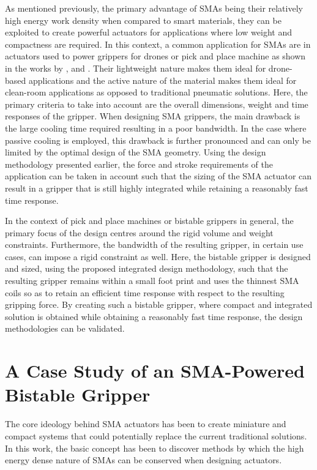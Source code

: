 As mentioned previously, the primary advantage of SMAs being their relatively high energy work density when compared to smart materials, they can be exploited to create powerful actuators for applications where low weight and compactness are required. In this context, a common application for SMAs are in actuators used to power grippers for drones or pick and place machine as shown in the works by \cite{luNovelDesignParallel2019}, \cite{leeLongShapeMemory2019} and \cite{modabberifarShapeMemoryAlloyactuated2018}. Their lightweight nature makes them ideal for drone-based applications and the active nature of the material makes them ideal for clean-room applications as opposed to traditional pneumatic solutions. Here, the primary criteria to take into account are the overall dimensions, weight and time responses of the gripper. When designing SMA grippers, the main drawback is the large cooling time required resulting in a poor bandwidth. In the case where passive cooling is employed, this drawback is further pronounced and can only be limited by the optimal design of the SMA geometry. Using the design methodology presented earlier, the force and stroke requirements of the application can be taken in account such that the sizing of the SMA actuator can result in a gripper that is still highly integrated while retaining a reasonably fast time response.

In the context of pick and place machines or bistable grippers in general, the primary focus of the design centres around the rigid volume and weight constraints. Furthermore, the bandwidth of the resulting gripper, in certain use cases, can impose a rigid constraint as well. Here, the bistable gripper is designed and sized, using the proposed integrated design methodology, such that the resulting gripper remains within a small foot print and uses the thinnest SMA coils so as to retain an efficient time response with respect to the resulting gripping force. By creating such a bistable gripper, where compact and integrated solution is obtained while obtaining a reasonably fast time response, the design methodologies can be validated.

\section{A Case Study of an SMA-Powered Bistable Gripper}\label{sec:smabb-gripper}
The core ideology behind SMA actuators has been to create miniature and compact systems that could potentially replace the current traditional solutions. In this work, the basic concept has been to discover methods by which the high energy dense nature of SMAs can be conserved when designing actuators.

